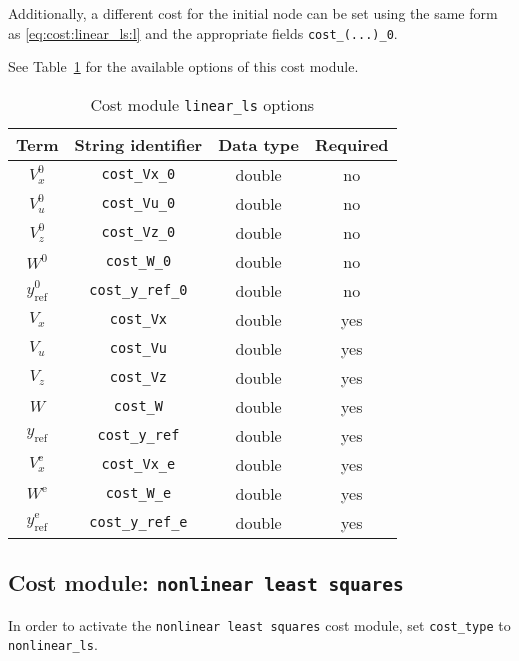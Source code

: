 \documentclass[english]{article}
\newcommand{\code}[1]{\texttt{#1}}
\newcommand{\ind}[1]{_{\textrm{#1}}}
\newcommand{\terminal}{^{\textrm{e}}}
\newcommand{\initial}{^{\textrm{0}}}
\newcommand{\mandatory}{yes}
\newcommand{\optional}{no}
\begin{document}
Additionally, a different cost for the initial node can be set using the same form as \eqref{eq:cost:linear_ls:l} and the appropriate fields \code{cost\_(...)\_0}.

See Table~\ref{tab:cost:linear_ls} for the available options of this cost module.
%
\begin{table}[ht!]
    \centering
    \caption{Cost module \code{linear\_ls} options} \label{tab:cost:linear_ls}
    \begin{tabular}{cccc}
        \toprule
        Term & String identifier & Data type & Required \\ \midrule
        $ V_x\initial $ & \code{cost\_Vx\_0}    & double & \optional   \\
        $ V_u\initial $ & \code{cost\_Vu\_0}    & double & \optional   \\
        $ V_z\initial $ & \code{cost\_Vz\_0}    & double & \optional  \\
        $ W\initial $ & \code{cost\_W\_0}    & double & \optional  \\
        $ y\ind{ref}\initial $ & \code{cost\_y\_ref\_0}    & double & \optional   \\ [1em]
        $ V_x $ & \code{cost\_Vx}    & double & \mandatory   \\
        $ V_u $ & \code{cost\_Vu}    & double & \mandatory   \\
        $ V_z $ & \code{cost\_Vz}    & double & \mandatory  \\
        $ W $ & \code{cost\_W}    & double & \mandatory  \\
        $ y\ind{ref} $ & \code{cost\_y\_ref}    & double & \mandatory   \\ [1em]
        $ V_x\terminal $ & \code{cost\_Vx\_e}    & double  & \mandatory  \\
        $ W\terminal $ & \code{cost\_W\_e}    & double & \mandatory   \\
        $ y\ind{ref}\terminal $ & \code{cost\_y\_ref\_e}   & double & \mandatory   \\
        \bottomrule
    \end{tabular}
\end{table}
%
\subsection{Cost module: \code{nonlinear least squares}}\label{sec:cost:nonlinear_ls}
%
In order to activate the \code{nonlinear least squares} cost module, set \code{cost\_type} to \code{nonlinear\_ls}.
\end{document}
